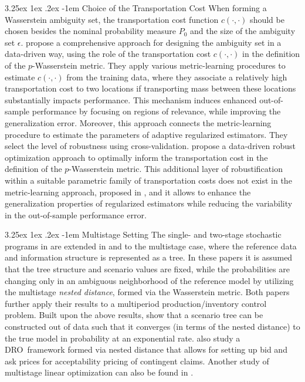 \documentclass[final,onefignum,onetabnum]{class}
\makeatletter
\renewcommand\paragraph{\@startsection{paragraph}{4}{\z@}%
  {3.25ex \@plus1ex \@minus.2ex}%
  {-1em}%
  {\normalfont\normalsize\bfseries}}
\newcommand{\dro}{DRO}
\makeatother
\begin{document}
\paragraph{Choice of the Transportation Cost}
When forming a Wasserstein ambiguity set, the transportation cost function $c(\cdot, \cdot)$ should be chosen besides the nominal probability measure $P_{0}$ and the size of the ambiguity set $\epsilon$.  \citet{blanchet2017transport} propose a comprehensive approach for designing the ambiguity set in a  data-driven way, using the role of the transportation cost $c(\cdot,\cdot)$ in the definition of the $p$-Wasserstein metric. They apply various metric-learning procedures to estimate $c(\cdot,\cdot)$ from the training data, where they associate a relatively high transportation cost to two locations if transporting mass between these locations substantially impacts performance. This mechanism induces enhanced out-of-sample performance by focusing  on regions of relevance, while improving the generalization error. Moreover, 
this approach connects the metric-learning procedure to estimate the parameters of adaptive regularized estimators. They select the level of robustness using cross-validation. %
\citet{blanchet2017doubly} propose a data-driven robust optimization approach to optimally inform the transportation cost in the definition of the $p$-Wasserstein metric. This additional layer of robustification within a suitable parametric family of transportation costs  does not exist in the metric-learning approach, proposed in \citet{blanchet2017transport}, and it allows to enhance the generalization properties of regularized estimators while reducing the variability in the out-of-sample performance error. 







\paragraph{Multistage Setting}
The single- and two-stage stochastic programs in \citet{pflug2014} are extended in \citet{analui2014} and \citet{pflug2014} to the multistage case, where the reference data and information structure is represented as a tree. In these papers it is assumed that the tree structure and scenario values are fixed, while   the probabilities are changing only in an ambiguous neighborhood of the reference model by utilizing the multistage {\it nested distance}, formed via the Wasserstein metric. Both papers further apply their results to a  multiperiod production/inventory control problem.  
Built upon the above results, \citet{glanzer2018} show that a scenario tree can be constructed out of data such that it converges (in terms of the nested distance) to the
true model in probability at an exponential rate.
\citet{glanzer2018} also study a \dro\ framework formed via nested distance that allows for setting up bid and ask prices for acceptability pricing of contingent claims. 
Another study of multistage  linear optimization can also be found in \citet{baziermatte2018}. 
\end{document}
